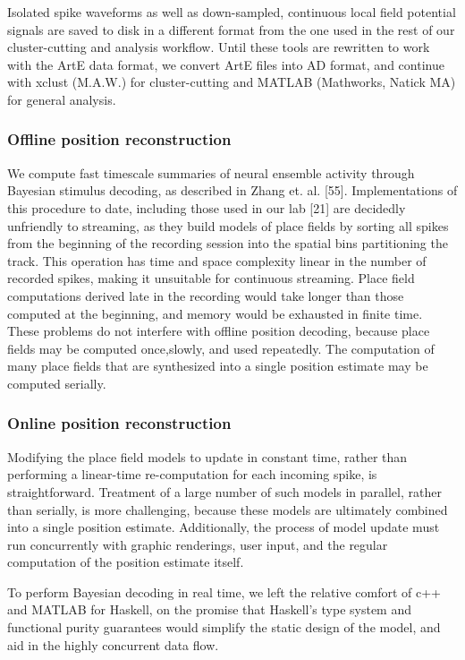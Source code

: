 \documentclass[]{article}
\begin{document}
Isolated spike waveforms as well as down-sampled, continuous local field
potential signals are saved to disk in a different format from the one
used in the rest of our cluster-cutting and analysis workflow. Until
these tools are rewritten to work with the ArtE data format, we convert
ArtE files into AD format, and continue with xclust (M.A.W.) for
cluster-cutting and MATLAB (Mathworks, Natick MA) for general analysis.

\subsubsection{Offline position reconstruction}

We compute fast timescale summaries of neural ensemble activity through
Bayesian stimulus decoding, as described in Zhang et. al. {[}55{]}.
Implementations of this procedure to date, including those used in our
lab {[}21{]} are decidedly unfriendly to streaming, as they build models
of place fields by sorting all spikes from the beginning of the
recording session into the spatial bins partitioning the track. This
operation has time and space complexity linear in the number of recorded
spikes, making it unsuitable for continuous streaming. Place field
computations derived late in the recording would take longer than those
computed at the beginning, and memory would be exhausted in finite time.
These problems do not interfere with offline position decoding, because
place fields may be computed once,slowly, and used repeatedly. The
computation of many place fields that are synthesized into a single
position estimate may be computed serially.

\subsubsection{Online position reconstruction}

Modifying the place field models to update in constant time, rather than
performing a linear-time re-computation for each incoming spike, is
straightforward. Treatment of a large number of such models in parallel,
rather than serially, is more challenging, because these models are
ultimately combined into a single position estimate. Additionally, the
process of model update must run concurrently with graphic renderings,
user input, and the regular computation of the position estimate itself.

To perform Bayesian decoding in real time, we left the relative comfort
of c++ and MATLAB for Haskell, on the promise that Haskell's type system
and functional purity guarantees would simplify the static design of the
model, and aid in the highly concurrent data flow.
\end{document}
